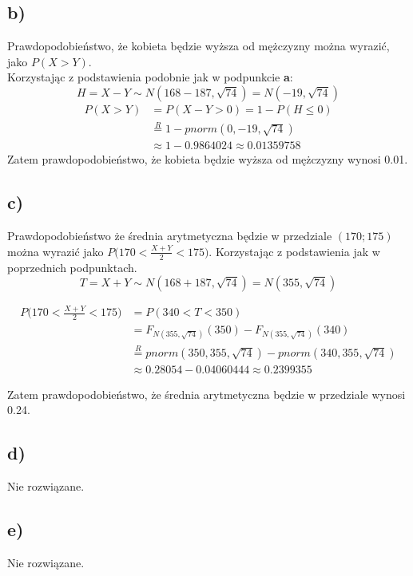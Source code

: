 \documentclass{article}
\begin{document}
\subsection*{b)}
Prawdopodobieństwo, że kobieta będzie wyższa od mężczyzny można wyrazić, jako $P(X>Y)$.\\
Korzystając z podstawienia podobnie jak w podpunkcie \textbf{a}:
$$H = X-Y \sim N(168-187,\sqrt{74}) = N(-19,\sqrt{74})$$
\begin{align*}
P(X>Y) & = P(X-Y>0) = 1 - P(H\leq0) \\
& \overset{R}{=} 1 - pnorm(0,-19,\sqrt{74}) \\
& \approx 1 - 0.9864024 \approx 0.01359758
\end{align*}
Zatem prawdopodobieństwo, że kobieta będzie wyższa od mężczyzny wynosi 0.01.

\subsection*{c)}
Prawdopodobieństwo że średnia arytmetyczna będzie w przedziale $(170; 175)$ można wyrazić jako $P\Big(170<\frac{X+Y}{2}<175\Big)$.
Korzystając z podstawienia jak w poprzednich podpunktach.
$$T = X+Y \sim N(168+187,\sqrt{74}) = N(355,\sqrt{74})$$

\begin{align*}
P \Big( 170 < \frac{X+Y}{2} < 175 \Big) & = P ( 340 < T < 350 ) \\
& = F_{N(355,\sqrt{74})}(350) - F_{N(355,\sqrt{74})}(340) \\
& \overset{R}{=} pnorm(350,355,\sqrt{74}) - pnorm(340,355,\sqrt{74}) \\
& \approx 0.28054 - 0.04060444 \approx 0.2399355
\end{align*}

Zatem prawdopodobieństwo, że średnia arytmetyczna będzie w przedziale wynosi 0.24.

\subsection*{d)}
Nie rozwiązane.

\subsection*{e)}
Nie rozwiązane.
\end{document}
